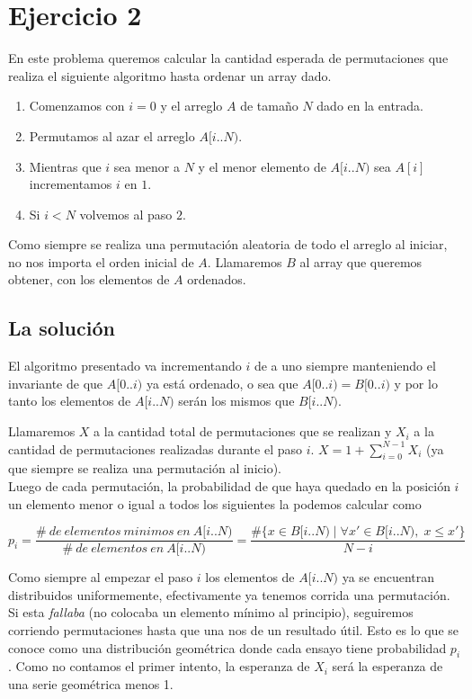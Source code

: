 \section{Ejercicio 2}

En este problema queremos calcular la cantidad esperada de permutaciones que realiza el siguiente algoritmo
hasta ordenar un array dado.

\begin{enumerate}
    \item Comenzamos con $i = 0$ y el arreglo $A$ de tamaño $N$ dado en la entrada.

    \item Permutamos al azar el arreglo $A[i..N)$.

    \item Mientras que $i$ sea menor a $N$ y el menor elemento de $A[i..N)$
            sea $A[i]$ incrementamos $i$ en $1$.

    \item Si $i < N$ volvemos al paso $2$.
\end{enumerate}

Como siempre se realiza una permutación aleatoria de todo el arreglo al iniciar,
no nos importa el orden inicial de $A$.
Llamaremos $B$ al array que queremos obtener, con los elementos de $A$ ordenados.

\subsection{La solución}

El algoritmo presentado va incrementando $i$ de a uno siempre manteniendo el invariante
de que $A[0..i)$ ya está ordenado, o sea que $A[0..i) = B[0..i)$ y por lo tanto
los elementos de $A[i..N)$ serán los mismos que $B[i..N)$.

Llamaremos $X$ a la cantidad total de permutaciones que se realizan y
$X_i$ a la cantidad de permutaciones realizadas durante el paso $i$.
$X = 1 + \sum_{i=0}^{N-1} X_i$ (ya que siempre se realiza una permutación al inicio).
\\

Luego de cada permutación, la probabilidad de que haya quedado en la posición $i$ un elemento
menor o igual a todos los siguientes la podemos calcular como

$$
p_i =
\frac{\#\ de\ elementos\ minimos\ en\ A[i..N)}{\#\ de\ elementos\ en\ A[i..N)} =
\frac{\#\{x \in B[i..N) \;|\; \forall x' \in B[i..N), \; x \leq x' \}}{N - i}
$$

Como siempre al empezar el paso $i$ los elementos de $A[i..N)$ ya se encuentran distribuidos uniformemente,
efectivamente ya tenemos corrida una permutación.
Si esta \textit{fallaba} (no colocaba un elemento mínimo al principio), seguiremos corriendo permutaciones
hasta que una nos de un resultado útil.
Esto es lo que se conoce como una distribución geométrica donde cada ensayo tiene probabilidad $p_i$.
Como no contamos el primer intento, la esperanza de $X_i$ será la esperanza de una serie geométrica menos 1.

